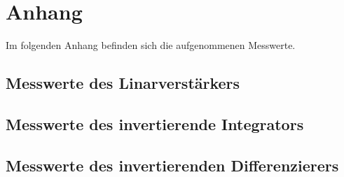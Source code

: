 \newpage
\section{Anhang}
Im folgenden Anhang befinden sich die aufgenommenen Messwerte.\\

\subsection{Messwerte des Linarverstärkers} 
\label{sub:Messwerte des Linarverstärkers}



\FloatBarrier

\newpage
\subsection{Messwerte des invertierende Integrators}
\label{sub:Messwerte des invertierende Integrators}

\FloatBarrier

\newpage
\subsection{Messwerte des invertierenden Differenzierers}
\label{sub:Messwerte des invertierenden Differenzierers}

\FloatBarrier


%
